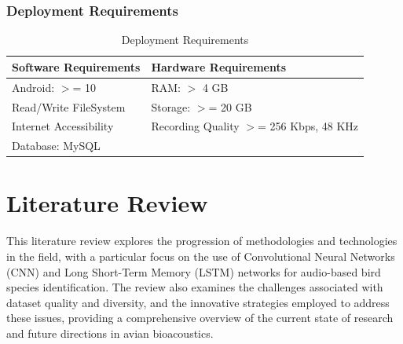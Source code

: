 \subsection{Deployment Requirements}
\begin{table}[ht]
    \centering
    \caption{Deployment Requirements}
    \begin{tabular}{|l|l|}
        \hline
        \textbf{Software Requirements} & \textbf{Hardware Requirements}
        \\ \hline
        Android: \(>\)= 10             & RAM: \(>\) 4 GB
        \\ \hline
        Read/Write FileSystem          & Storage: \(>\)= 20 GB
        \\ \hline
        Internet Accessibility         & Recording Quality \(>\)= 256 Kbps, 48
        KHz
        \\ \hline
        Database: MySQL             &                                       \\ \hline
    \end{tabular}
\end{table}

\chapter{Literature Review}

This literature review explores the progression of methodologies and
technologies in the field, with a particular focus on the use of Convolutional
Neural Networks (CNN) and Long Short-Term Memory (LSTM) networks for
audio-based bird species identification. The review also examines the
challenges associated with dataset quality and diversity, and the innovative
strategies employed to address these issues, providing a comprehensive overview
of the current state of research and future directions in avian bioacoustics.

